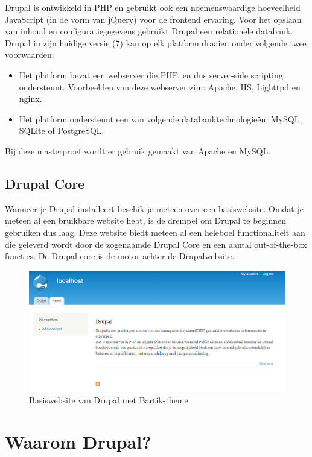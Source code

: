 Drupal is ontwikkeld in PHP en gebruikt ook een noemenswaardige hoeveelheid JavaScript (in de vorm van jQuery) voor de frontend ervaring. Voor  het opslaan van inhoud en configuratiegegevens gebruikt Drupal een relationele databank. Drupal in zijn huidige versie (7) kan op elk platform draaien onder volgende twee voorwaarden:
\begin{itemize}
\item Het platform bevat een webserver die PHP, en dus server-side scripting ondersteunt. Voorbeelden van deze webserver zijn:  Apache, IIS, Lighttpd en nginx.
\item Het platform ondersteunt een van volgende databanktechnologie\"{e}n: MySQL, SQLite of PostgreSQL.
\end{itemize}
Bij deze masterproef wordt er gebruik gemaakt van Apache en MySQL.

\subsection{Drupal Core}

Wanneer je Drupal installeert beschik je meteen over een basiswebsite. Omdat je meteen al een bruikbare website hebt, is de drempel om Drupal te beginnen gebruiken dus laag. Deze website biedt meteen al een heleboel functionaliteit aan die geleverd wordt door de zogenaamde Drupal Core en een aantal out-of-the-box functies. De Drupal core is de motor achter de Drupalwebsite.
\begin{figure}[h]
\begin{center}
\includegraphics[keepaspectratio,width=1\textwidth]{fig/drupalBasiswebsite}
\vspace{-40pt}
\caption{Basiswebsite van Drupal met Bartik-theme}
\end{center}
\end{figure}

\section{Waarom Drupal?}

